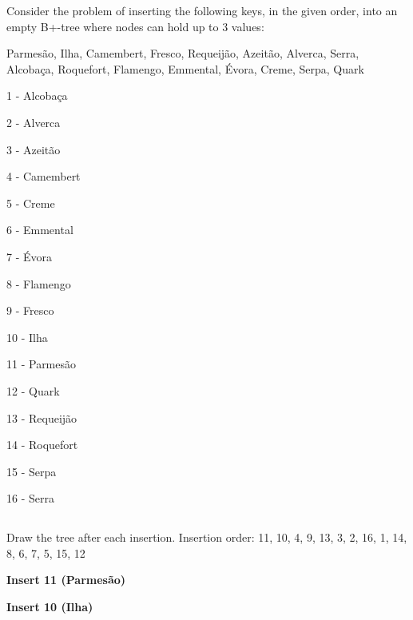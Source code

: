 

	{\color{gray}Consider the problem of inserting the following keys, in the given order, into an empty B+-tree where nodes can hold up to 3 values:}
	
	{\color{gray}Parmesão, Ilha, Camembert, Fresco, Requeijão, Azeitão, Alverca, Serra, Alcobaça, Roquefort, Flamengo, Emmental, Évora, Creme, Serpa, Quark}

1 - Alcobaça

2 - Alverca

3 - Azeitão

4 - Camembert

5 - Creme

6 - Emmental

7 - Évora

8 - Flamengo

9 - Fresco

10 - Ilha

11 - Parmesão

12 - Quark

13 - Requeijão

14 - Roquefort

15 - Serpa

16 - Serra

	\subsection{}
	{\color{gray}Draw the tree after each insertion.}
 		Insertion order: 11, 10, 4, 9, 13, 3, 2, 16, 1, 14, 8, 6, 7, 5, 15, 12



\textbf{Insert 11 (Parmesão)}
\begin{center}
\end{center}

\textbf{Insert 10 (Ilha)}
\begin{center}
\end{center}

